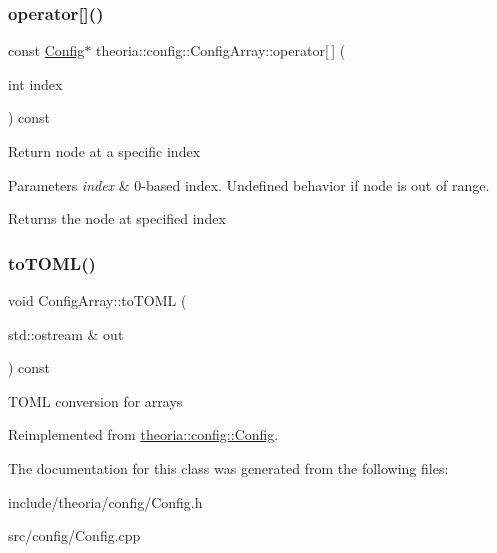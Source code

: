 \subsubsection{\texorpdfstring{operator[]()}{operator[]()}}
{\footnotesize\ttfamily const \hyperlink{classtheoria_1_1config_1_1Config}{Config}$\ast$ theoria\+::config\+::\+Config\+Array\+::operator\mbox{[}$\,$\mbox{]} (\begin{DoxyParamCaption}\item[{int}]{index }\end{DoxyParamCaption}) const\hspace{0.3cm}{\ttfamily [inline]}}

Return node at a specific index 
\begin{DoxyParams}{Parameters}
{\em index} & 0-\/based index. Undefined behavior if node is out of range. \\
\hline
\end{DoxyParams}
\begin{DoxyReturn}{Returns}
the node at specified index 
\end{DoxyReturn}
\mbox{\label{classtheoria_1_1config_1_1ConfigArray_a1c73dba526ebd747682bc961676f5158}} 
\subsubsection{\texorpdfstring{to\+T\+O\+M\+L()}{toTOML()}}
{\footnotesize\ttfamily void Config\+Array\+::to\+T\+O\+ML (\begin{DoxyParamCaption}\item[{std\+::ostream \&}]{out }\end{DoxyParamCaption}) const\hspace{0.3cm}{\ttfamily [virtual]}}

T\+O\+ML conversion for arrays 

Reimplemented from \hyperlink{classtheoria_1_1config_1_1Config_a6fe5db76067cd30d5b5ed02c49770d6f}{theoria\+::config\+::\+Config}.



The documentation for this class was generated from the following files\+:\begin{DoxyCompactItemize}
\item 
include/theoria/config/Config.\+h\item 
src/config/Config.\+cpp\end{DoxyCompactItemize}
